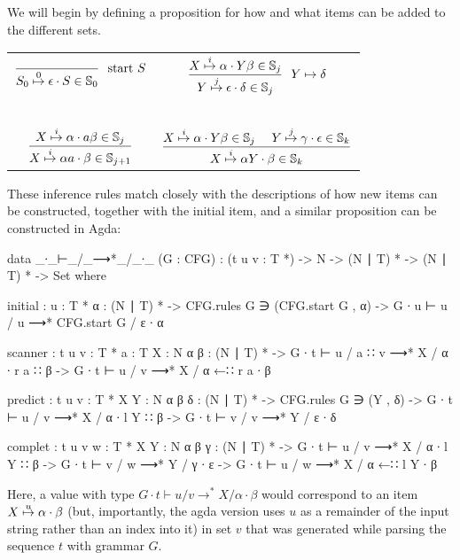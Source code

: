 		We will begin by defining a proposition for how and what items can be
		added to the different sets.

		\begin{table}[h]
			\centering
			\begin{tabular}{cc}
				\( \displaystyle \frac{}
					{\earley{S_0}{\epsilon}{S}{0} \in \mathbb{S}_0}
					~~\textrm{start } S
					\) &
				\( \displaystyle \frac
					{\earley{X}{\alpha}{Y\beta}{i} \in \mathbb{S}_j}
					{\earley{Y}{\epsilon}{\delta}{j} \in \mathbb{S}_j}
					~~Y \mapsto \delta
					\) 
				\\~&~\\
				\( \displaystyle \frac
					{\earley{X}{\alpha}{a\beta}{i} \in \mathbb{S}_j}
					{\earley{X}{\alpha a}{\beta}{i} \in \mathbb{S}_{j+1}} 
					\) &
				\( \displaystyle \frac
					{
						\earley{X}{\alpha}{Y\beta}{i} \in \mathbb{S}_j~~~~
						\earley{Y}{\gamma}{\epsilon}{j} \in \mathbb{S}_k
						}
					{\earley{X}{\alpha Y}{\beta}{i} \in \mathbb{S}_k} 
					\)
			\end{tabular}
		\end{table}

		These inference rules match closely with the descriptions of how new
		items can be constructed, together with the initial item, and a similar
		proposition can be constructed in Agda:

		\begin{code}
			data _∙_⊢_/_⟶*_/_∙_ (G : CFG) :
			  (t u v : T *) -> N -> (N ∣ T) * -> (N ∣ T) * -> Set where

			  initial : {u : T *} {α : (N ∣ T) *} ->
			    CFG.rules G ∋ (CFG.start G , α) ->
			    G ∙ u ⊢ u / u ⟶* CFG.start G / ε ∙ α

			  scanner : {t u v : T *} {a : T} {X : N} {α β : (N ∣ T) *} ->
			    G ∙ t ⊢ u / a ∷ v ⟶* X / α ∙ r a ∷ β ->
			      G ∙ t ⊢ u / v ⟶* X / α ←∷ r a ∙ β

			  predict : {t u v : T *} {X Y : N} {α β δ : (N ∣ T) *} ->
			    CFG.rules G ∋ (Y , δ) ->
			    G ∙ t ⊢ u / v ⟶* X / α ∙ l Y ∷ β ->
			      G ∙ t ⊢ v / v ⟶* Y / ε ∙ δ

			  complet : {t u v w : T *} {X Y : N} {α β γ : (N ∣ T) *} ->
			    G ∙ t ⊢ u / v ⟶* X / α ∙ l Y ∷ β ->
			    G ∙ t ⊢ v / w ⟶* Y / γ ∙ ε ->
			      G ∙ t ⊢ u / w ⟶* X / α ←∷ l Y ∙ β
		\end{code}

		Here, a value with type $G \cdot t \vdash u / v \rightarrow^* X /
		\alpha \cdot \beta$ would correspond to an item
		$\earley{X}{\alpha}{\beta}{u}$ (but, importantly, the agda version uses
		$u$ as a remainder of the input string rather than an index into it) in
		set $v$ that was generated while parsing the sequence $t$ with grammar
		$G$.

